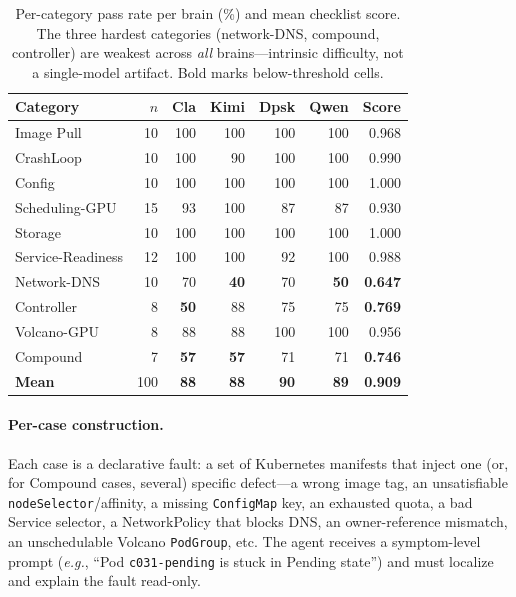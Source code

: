 \documentclass[letterpaper]{article}
\newcommand{\eg}{\textit{e.g.}}
\begin{document}
\begin{table}[t]
\centering
\caption{Per-category pass rate per brain (\%) and mean checklist score. The three hardest categories (network-DNS, compound, controller) are weakest across \emph{all} brains---intrinsic difficulty, not a single-model artifact. Bold marks below-threshold cells.}
\label{tab:categories}
\small
\setlength{\tabcolsep}{4pt}
\begin{tabular}{@{}lrrrrrr@{}}
\toprule
\textbf{Category} & \textbf{$n$} & \textbf{Cla} & \textbf{Kimi} & \textbf{Dpsk} & \textbf{Qwen} & \textbf{Score} \\
\midrule
Image Pull        & 10 & 100 & 100 & 100 & 100 & 0.968 \\
CrashLoop         & 10 & 100 & 90  & 100 & 100 & 0.990 \\
Config            & 10 & 100 & 100 & 100 & 100 & 1.000 \\
Scheduling-GPU    & 15 & 93  & 100 & 87  & 87  & 0.930 \\
Storage           & 10 & 100 & 100 & 100 & 100 & 1.000 \\
Service-Readiness & 12 & 100 & 100 & 92  & 100 & 0.988 \\
Network-DNS       & 10 & 70  & \textbf{40} & 70 & \textbf{50} & \textbf{0.647} \\
Controller        & 8  & \textbf{50} & 88 & 75 & 75 & \textbf{0.769} \\
Volcano-GPU       & 8  & 88  & 88  & 100 & 100 & 0.956 \\
Compound          & 7  & \textbf{57} & \textbf{57} & 71 & 71 & \textbf{0.746} \\
\midrule
\textbf{Mean}     & 100 & \textbf{88} & \textbf{88} & \textbf{90} & \textbf{89} & \textbf{0.909} \\
\bottomrule
\end{tabular}
\end{table}

\paragraph{Per-case construction.}
Each case is a declarative fault: a set of Kubernetes manifests that inject one (or, for Compound cases, several) specific defect---a wrong image tag, an unsatisfiable \texttt{nodeSelector}/affinity, a missing \texttt{ConfigMap} key, an exhausted quota, a bad Service selector, a NetworkPolicy that blocks DNS, an owner-reference mismatch, an unschedulable Volcano \texttt{PodGroup}, etc.
The agent receives a symptom-level prompt (\eg, ``Pod \texttt{c031-pending} is stuck in Pending state'') and must localize and explain the fault read-only.
\end{document}
